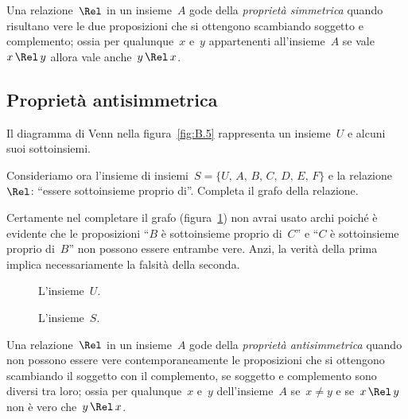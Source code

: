 \begin{definizione}
Una relazione~$\Rel$ in un insieme~$A$ gode della \emph{proprietà simmetrica} quando risultano vere le due proposizioni
che si ottengono scambiando soggetto e complemento; ossia per qualunque~$x$ e~$y$ appartenenti all'insieme~$A$ se vale~$x \,\Rel\, y$
allora vale anche~$y \,\Rel\, x$.
\end{definizione}

\ovalbox{\risolvi \ref{ese:B.21}}

\subsection{Proprietà antisimmetrica}

\begin{exrig}
 \begin{esempio}

Il diagramma di Venn nella figura~\ref{fig:B.5} rappresenta un insieme~$U$ e alcuni suoi sottoinsiemi.

Consideriamo ora l'insieme di insiemi~$S = \{U\text{,~}A\text{,~}B\text{,~}C\text{,~}D\text{,~}E\text{,~}F\}$ e la relazione~$\Rel$: ``essere sottoinsieme proprio di''.
Completa il grafo della relazione.

Certamente nel completare il grafo (figura~\ref{fig:B.6}) non avrai usato archi poiché è evidente che le proposizioni ``$B$ è sottoinsieme proprio di~$C$'' e ``$C$
è sottoinsieme proprio di~$B$'' non possono essere entrambe vere. Anzi, la verità della prima implica necessariamente la falsità della seconda.
 \end{esempio}
\end{exrig}

\begin{figure}[hb]
\begin{minipage}[b]{.45\textwidth}
 \centering
 
 \caption{L'insieme~$U$.}\label{fig:B.5}
\end{minipage}\hfil
\begin{minipage}[b]{.45\textwidth}
 \centering
 
 \caption{L'insieme~$S$.}\label{fig:B.6}
\end{minipage}
\end{figure}

\begin{definizione}
Una relazione~$\Rel$ in un insieme~$A$ gode della \emph{proprietà antisimmetrica} quando non possono essere vere
contemporaneamente le proposizioni che si ottengono scambiando il soggetto con il complemento, se soggetto e complemento sono diversi
tra loro; ossia per qualunque~$x$ e~$y$ dell'insieme~$A$ se~$x \neq y$ e se~$x \,\Rel\, y$ non è vero che~$y \,\Rel\, x$.
\end{definizione}

